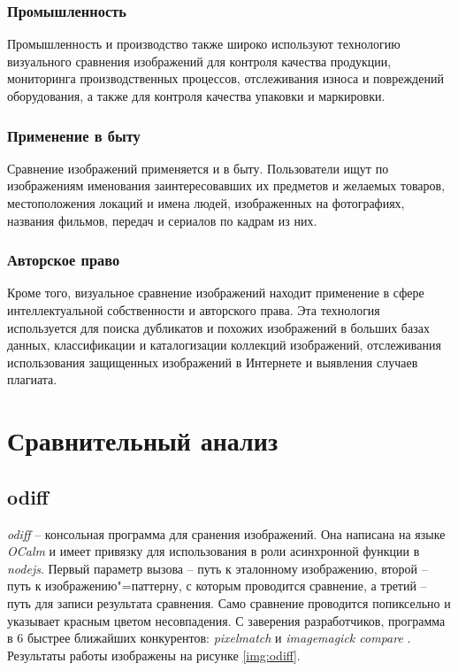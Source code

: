 \subsubsection{Промышленность}
Промышленность и производство также широко используют технологию визуального
сравнения изображений для контроля качества продукции, мониторинга
производственных процессов, отслеживания износа и повреждений оборудования, а
также для контроля качества упаковки и маркировки.

\subsubsection{Применение в быту}
Сравнение изображений применяется и в быту. Пользователи ищут по изображениям
именования заинтересовавших их предметов и желаемых товаров, местоположения
локаций и имена людей, изображенных на фотографиях, названия фильмов, передач и
сериалов по кадрам из них.

\subsubsection{Авторское право}
Кроме того, визуальное сравнение изображений находит применение в сфере
интеллектуальной собственности и авторского права. Эта технология используется
для поиска дубликатов и похожих изображений в больших базах данных,
классификации и каталогизации коллекций изображений, отслеживания использования
защищенных изображений в Интернете и выявления случаев плагиата.

\section{Сравнительный анализ}

\subsection{odiff}

\textit{odiff} -- консольная программа для сранения изображений. Она написана на
языке \textit{OCalm} и имеет привязку для использования в роли асинхронной
функции в \textit{nodejs}. Первый параметр вызова -- путь к эталонному
изображению, второй -- путь к изображению"=паттерну, с которым проводится
сравнение, а третий -- путь для записи результата сравнения. Само сравнение
проводится попиксельно и указывает красным цветом несовпадения. С заверения
разработчиков, программа в 6 быстрее ближайших конкурентов: \textit{pixelmatch}
и \textit{imagemagick compare} \cite{about-odiff}. Результаты работы изображены
на рисунке \ref{img:odiff}.

